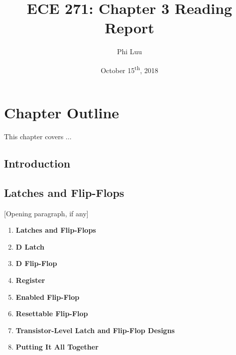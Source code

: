 \documentclass[12pt]{article}
\title{ECE 271: Chapter 3 Reading Report}
\author{Phi Luu}
\date{October 15\textsuperscript{th}, 2018}
\begin{document}
\maketitle

\section{Chapter Outline}

This chapter covers ...

\subsection{Introduction}

\subsection{Latches and Flip-Flops}

[Opening paragraph, if any]

\begin{enumerate}
    \item \textbf{Latches and Flip-Flops}

    \item \textbf{D Latch}

    \item \textbf{D Flip-Flop}

    \item \textbf{Register}

    \item \textbf{Enabled Flip-Flop}

    \item \textbf{Resettable Flip-Flop}

    \item \textbf{Transistor-Level Latch and Flip-Flop Designs}

    \item \textbf{Putting It All Together}
\end{enumerate}
\end{document}
